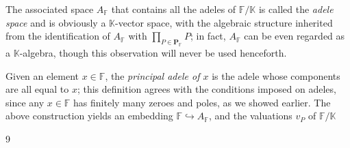 \documentclass[11pt]{article}
\theoremstyle{scplain}
\begin{document}
The associated space $A_{\mathbb{F}}$ that contains all the adeles of
$\mathbb{F}/\mathbb{K}$ is called the \emph{adele space} and is obviously a
$\mathbb{K}$-vector space, with the algebraic structure inherited from the
identification of $A_{\mathbb{F}}$ with
$\prod_{P \in \mathbf{P}_{\mathbb{F}}} P$; in fact, $A_{\mathbb{F}}$ can be even
regarded as a $\mathbb{K}$-algebra, though this observation will never be used
henceforth.

Given an element $x \in \mathbb{F}$, the \emph{principal adele of $x$} is the
adele whose components are all equal to $x$; this definition agrees with the
conditions imposed on adeles, since any $x \in \mathbb{F}$ has finitely many
zeroes and poles, as we showed earlier. The above construction yields an
embedding $\mathbb{F} \hookrightarrow A_{\mathbb{F}}$, and the valuations $v_P$
of $\mathbb{F}/\mathbb{K}$

\begin{center}9\end{center}
\end{document}

